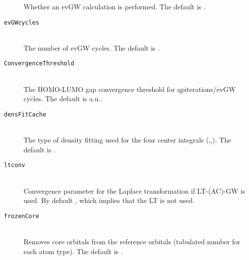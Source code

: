 \begin{description}
  Whether an evGW calculation is performed. The default is .
  \item [\texttt{evGWcycles}]\hfill \\
  The number of evGW cycles. The default is .
  \item [\texttt{ConvergenceThreshold}]\hfill \\
  The HOMO-LUMO gap convergence threshold for qpiterations/evGW cycles. The default is  a.u..
  \item [\texttt{densFitCache}]\hfill \\
  The type of density fitting used for the four center integrals (,,). The default is .
  \item [\texttt{ltconv}]\hfill \\
  Convergence parameter for the Laplace transformation if LT-(AC)-GW is used. By default , which implies that the LT is not used.
  \item [\texttt{frozenCore}]\hfill \\
  Removes core orbitals from the reference orbitals (tabulated number for each atom type). The default is .
  \end{description}

